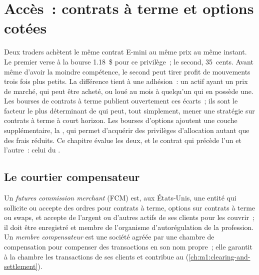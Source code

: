 \chapter{Accès~: contrats à terme et options cotées}\label{ch:m1:getting-access-futures-options}

Deux traders achètent le même contrat E-mini au même prix au même
instant. Le premier verse à la bourse 1.18~\$ pour ce privilège~; le second, 35~cents.
Avant même d'avoir la moindre compétence, le second peut tirer profit de
mouvements trois fois plus petits. La différence tient à une adhésion~: un actif ayant un prix de marché, qui
peut être acheté, ou loué au mois à quelqu'un qui en possède une. Les bourses de contrats à terme
publient ouvertement ces écarts~; ils sont le facteur le plus
déterminant de qui peut, tout simplement, mener une stratégie sur contrats à terme à court horizon. Les bourses d'options
ajoutent une couche supplémentaire, la , qui
permet d'acquérir des privilèges d'allocation autant que des frais réduits. Ce chapitre évalue les deux, et
le contrat qui précède l'un et l'autre~: celui du .

\section{Le courtier compensateur}

\begin{definition}\label{def:m1:getting-access-futures-options:fcm}
Un \emph{futures commission merchant} (FCM)
est, aux États-Unis, une entité qui sollicite ou accepte des ordres pour
contrats à terme, options sur contrats à terme ou swaps, et accepte de l'argent ou d'autres actifs
de ses clients pour les couvrir~; il doit être enregistré et membre de
l'organisme d'autorégulation de la profession.
Un \emph{membre compensateur} est une société agréée par une chambre de compensation pour compenser
des transactions en son nom propre~; elle garantit à la chambre les transactions de ses clients et
contribue au  (\cref{ch:m1:clearing-and-settlement}).
\end{definition}

